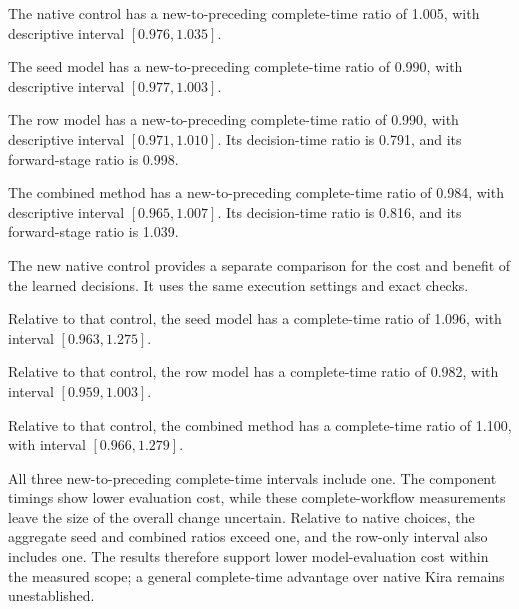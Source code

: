 \begin{samepage}
The native control has a new-to-preceding complete-time ratio of 1.005, with descriptive interval $[0.976,1.035]$.
\par\end{samepage}

\begin{samepage}
The seed model has a new-to-preceding complete-time ratio of 0.990, with descriptive interval $[0.977,1.003]$.
\par\end{samepage}

\begin{samepage}
The row model has a new-to-preceding complete-time ratio of 0.990, with descriptive interval $[0.971,1.010]$. Its decision-time ratio is 0.791, and its forward-stage ratio is 0.998.
\par\end{samepage}

\begin{samepage}
The combined method has a new-to-preceding complete-time ratio of 0.984, with descriptive interval $[0.965,1.007]$. Its decision-time ratio is 0.816, and its forward-stage ratio is 1.039.
\par\end{samepage}

The new native control provides a separate comparison for the cost and benefit of the learned decisions. It uses the same execution settings and exact checks.

\begin{samepage}
Relative to that control, the seed model has a complete-time ratio of 1.096, with interval $[0.963,1.275]$.
\par\end{samepage}

\begin{samepage}
Relative to that control, the row model has a complete-time ratio of 0.982, with interval $[0.959,1.003]$.
\par\end{samepage}

\begin{samepage}
Relative to that control, the combined method has a complete-time ratio of 1.100, with interval $[0.966,1.279]$.
\par\end{samepage}

All three new-to-preceding complete-time intervals include one. The component timings show lower evaluation cost, while these complete-workflow measurements leave the size of the overall change uncertain. Relative to native choices, the aggregate seed and combined ratios exceed one, and the row-only interval also includes one. The results therefore support lower model-evaluation cost within the measured scope; a general complete-time advantage over native Kira remains unestablished.

